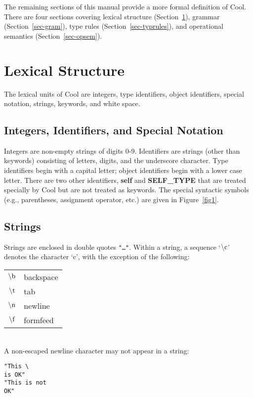 \documentclass[11pt]{article}
\begin{document}
The remaining sections of this manual provide a more formal definition
of Cool.  There are four sections covering lexical structure (Section~\ref{lex-struct}), grammar (Section~\ref{sec-gram}), type rules (Section~\ref{sec-typrules}),
and operational semantics (Section~\ref{sec-opsem}).

\section{Lexical Structure}
\label{lex-struct}

The lexical units of Cool are integers, type
identifiers, object identifiers, special notation, strings, keywords,
and white space.

\subsection{Integers, Identifiers, and Special Notation}

Integers are non-empty strings of digits 0-9.  
Identifiers are strings (other than keywords) consisting of letters,
digits, and the underscore character.  Type identifiers begin with a
capital letter; object identifiers begin with a lower case letter.
There are two other identifiers,
{\bf self} and {\bf SELF\_TYPE} that are treated specially by Cool but are not
treated as keywords.  The special syntactic symbols (e.g., parentheses, assignment
operator, etc.) are given in Figure~\ref{fig1}.

\subsection{Strings}

Strings are enclosed in double quotes {\tt "\ldots"}.  Within a string, a
sequence `$\rm \backslash c$' denotes the character `c', with the exception of
the following: \\[.1in]
\begin{tabular}{rl}
$\rm \backslash b$ & backspace \\
$\rm \backslash t$ & tab \\
$\rm \backslash n$ & newline \\
$\rm \backslash f$ & formfeed
\end{tabular} \\[.1in]

A non-escaped newline character may not appear in a string:
\begin{verbatim}
"This \
is OK"
"This is not
OK"
\end{verbatim}
\end{document}

